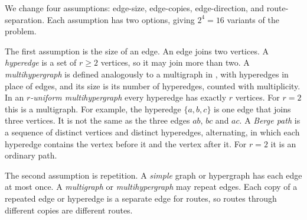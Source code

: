 We change four assumptions: edge-size, edge-copies, edge-direction, and route-separation. Each assumption has two options, giving $2^4=16$ variants of the problem.

The first assumption is the size of an edge.
An edge joins two vertices. A \emph{hyperedge} is a set of $r\ge2$ vertices, so it may join more than two.
A \emph{multihypergraph} is defined analogously to a multigraph in , with hyperedges in place of edges, and its size is its number of hyperedges, counted with multiplicity.
In an \emph{$r$-uniform multihypergraph} every hyperedge has exactly $r$ vertices. For $r=2$ this is a multigraph.
For example, the hyperedge $\{a,b,c\}$ is one edge that joins three vertices. It is not the same as the three edges $ab$, $bc$ and $ac$.
A \emph{Berge path} is a sequence of distinct vertices and distinct hyperedges, alternating, in which each hyperedge contains the vertex before it and the vertex after it.
For $r=2$ it is an ordinary path.

The second assumption is repetition.
A \emph{simple} graph or hypergraph has each edge at most once.
A \emph{multigraph} or \emph{multihypergraph} may repeat edges.
Each copy of a repeated edge or hyperedge is a separate edge for routes, so routes through different copies are different routes.


